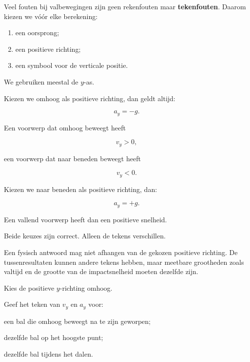 \documentclass{ximera}
\begin{document}
Veel fouten bij valbewegingen zijn geen rekenfouten maar
\textbf{tekenfouten}. Daarom kiezen we vóór elke berekening:

\begin{enumerate}
  \item een oorsprong;
  \item een positieve richting;
  \item een symbool voor de verticale positie.
\end{enumerate}

We gebruiken meestal de $y$-as.



Kiezen we omhoog als positieve richting, dan geldt altijd:

\[
\boxed{a_y=-g.}
\]

Een voorwerp dat omhoog beweegt heeft

\[
v_y>0,
\]

een voorwerp dat naar beneden beweegt heeft

\[
v_y<0.
\]



Kiezen we naar beneden als positieve richting, dan:

\[
\boxed{a_y=+g.}
\]

Een vallend voorwerp heeft dan een positieve snelheid.

Beide keuzes zijn correct. Alleen de tekens verschillen.

\begin{eigenschap}

Een fysisch antwoord mag niet afhangen van de gekozen positieve
richting. De tussenresultaten kunnen andere tekens hebben, maar
meetbare grootheden zoals valtijd en de grootte van de impactsnelheid
moeten dezelfde zijn.

\end{eigenschap}


\begin{oefening}[Tekencheck]{\oefB\ESS}

Kies de positieve $y$-richting omhoog.

Geef het teken van $v_y$ en $a_y$ voor:

\begin{question}
een bal die omhoog beweegt na te zijn geworpen;
\end{question}

\begin{question}
dezelfde bal op het hoogste punt;
\end{question}

\begin{question}
dezelfde bal tijdens het dalen.
\end{question}

\end{oefening}
\end{document}
